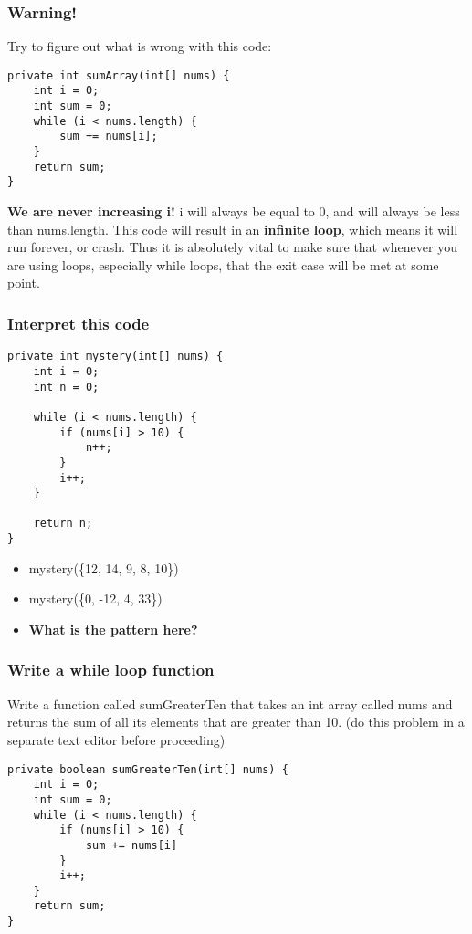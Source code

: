 \documentclass{beamer}
\begin{document}
\begin{frame}[fragile]
\frametitle{Warning!}
Try to figure out what is wrong with this code:
\begin{lstlisting}[style=basenopause]
private int sumArray(int[] nums) {
    int i = 0;
    int sum = 0;
    while (i < nums.length) {
        sum += nums[i];
    }
    return sum;
}
\end{lstlisting}
\pause
\textbf{We are never increasing i!} i will always be equal to 0, and will always be less than nums.length. This code will result in an \textbf{infinite loop}, which means it will run forever, or crash. Thus it is absolutely vital to make sure that whenever you are using loops, especially while loops, that the exit case will be met at some point.
\end{frame}

\begin{frame}[fragile]
\frametitle{Interpret this code}
\begin{lstlisting}
private int mystery(int[] nums) {
    int i = 0;
    int n = 0;
    
    while (i < nums.length) {
        if (nums[i] > 10) {
            n++;
        }
        i++;
    }
    
    return n;
}
\end{lstlisting}

\begin{itemize}
\item<2-> mystery(\{12, 14, 9, 8, 10\})
\item<3-> mystery(\{0, -12, 4, 33\})
\item<4-> \textbf{What is the pattern here?}
\end{itemize}
\end{frame}

\begin{frame}[fragile]
\frametitle{Write a while loop function}
Write a function called sumGreaterTen that takes an int array called nums and returns the sum of all its elements that are greater than 10.
\pause 
(do this problem in a separate text editor before proceeding)
\pause
\begin{lstlisting}
private boolean sumGreaterTen(int[] nums) {
    int i = 0;
    int sum = 0;
    while (i < nums.length) {
        if (nums[i] > 10) {
            sum += nums[i]
        }
        i++;
    }
    return sum;
}
\end{lstlisting}
\end{frame}
\end{document}
